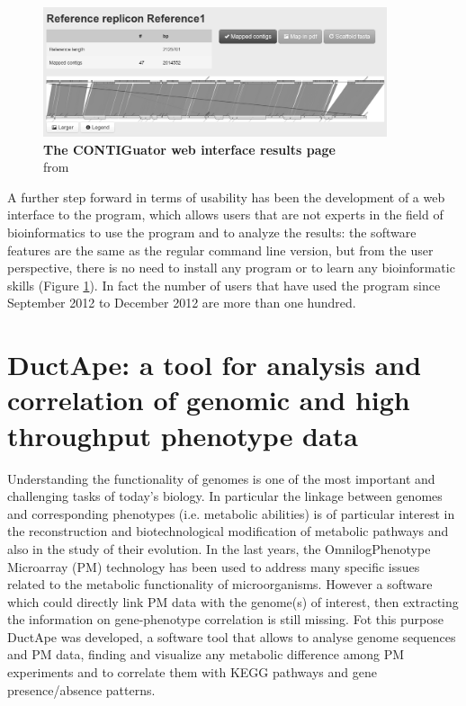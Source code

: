 \begin{figure}[!tb]
	\center
    \includegraphics[width=0.9\textwidth]{figures/2/thesis_26}
	\caption{\label{fig:contiguatorweb}\textbf{The CONTIGuator web interface results page}\\
			from \cite{contiguator2}}
\end{figure}

A further step forward in terms of usability has been the development of a web interface to the program, which allows users that are not experts in the field of bioinformatics to use the program and to analyze the results: the software features are the same as the regular command line version, but from the user perspective, there is no need to install any program or to learn any bioinformatic skills (Figure \ref{fig:contiguatorweb}). In fact the number of users that have used the program since September 2012 to December 2012 are more than one hundred. 

\newpage
\section{DuctApe: a tool for analysis and correlation of genomic and high throughput phenotype data}
\label{sec:ductape}
Understanding the functionality of genomes is one of the most important and challenging tasks of today's biology. In particular the linkage between genomes and corresponding phenotypes (i.e. metabolic abilities) is of particular interest in the reconstruction and biotechnological modification of metabolic pathways and also in the study of their evolution. In the last years, the Omnilog\texttrademark Phenotype Microarray (PM) technology has been used to address many specific issues related to the metabolic functionality of microorganisms. However a software which could directly link PM data with the genome(s) of interest, then extracting the information on gene-phenotype correlation is still missing. Fot this purpose DuctApe was developed, a software tool that allows to analyse genome sequences and PM data, finding and visualize any metabolic difference among PM experiments and to correlate them with KEGG pathways and gene presence/absence patterns.

